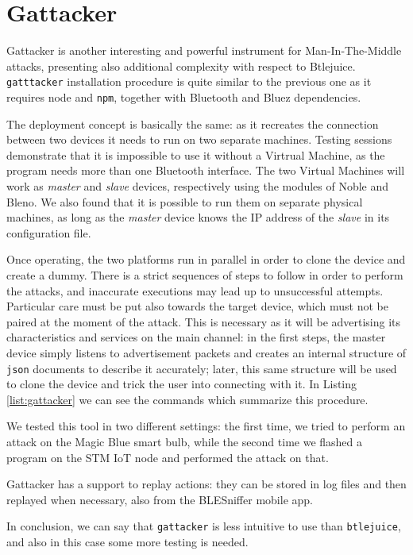 \section{Gattacker}
Gattacker \cite{gattacker-repo} is another interesting and powerful instrument for Man-In-The-Middle attacks, presenting also additional complexity with respect to Btlejuice. \texttt{gatttacker} installation procedure is quite similar to the previous one as it requires node and \texttt{npm}, together with Bluetooth and Bluez dependencies.

The deployment concept is basically the same: as it recreates the connection between two devices it needs to run on two separate machines. Testing sessions demonstrate that it is impossible to use it without a Virtrual Machine, as the program needs more than one Bluetooth interface. The two Virtual Machines will work as \textit{master} and \textit{slave} devices, respectively using the modules of Noble and Bleno. We also found that it is possible to run them on separate physical machines, as long as the \textit{master} device knows the IP address of the \textit{slave} in its configuration file.

Once operating, the two platforms run in parallel in order to clone the device and create a dummy.
There is a strict sequences of steps to follow in order to perform the attacks, and inaccurate executions may lead up to unsuccessful attempts. Particular care must be put also towards the target device, which must not be paired at the moment of the attack. This is necessary as it will be advertising its characteristics and services on the main channel: in the first steps, the master device simply listens to advertisement packets and creates an internal structure of \texttt{json} documents to describe it accurately; later, this same structure will be used to clone the device and trick the user into connecting with it. In Listing \ref{list:gattacker} we can see the commands which summarize this procedure.


We tested this tool in two different settings: the first time, we tried to perform an attack on the Magic Blue smart bulb, while the second time we flashed a program on the STM IoT node and performed the attack on that.

Gattacker has a support to replay actions: they can be stored in log files and then replayed when necessary, also from the BLESniffer mobile app.

In conclusion, we can say that \texttt{gattacker} is less intuitive to use than \texttt{btlejuice}, and also in this case some more testing is needed.